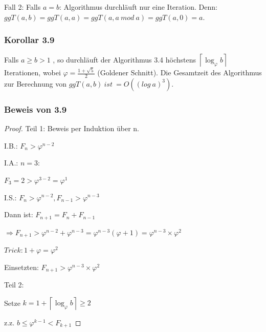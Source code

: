\documentclass[12pt]{article}
\begin{document}
\begin{algorithm}
\vspace{0.2cm}
\noindent Fall 2: Falls $a=b$: Algorithmus durchläuft nur eine Iteration. Denn: $ggT(a,b)= ggT(a,a)= ggT(a, a \ mod \ a)= ggT(a, 0) = a$.

\vspace{1cm}
\subsubsection*{Korollar 3.9}
Falls $a \geq b > 1 $ , so durchläuft der Algorithmus 3.4 höchstens $\left\lceil \log_{\varphi} b \right\rceil$ Iterationen, wobei $\varphi = \frac{1 + \sqrt{5}}{2}$  (Goldener Schnitt).
Die Gesamtzeit des Algorithmus zur Berechnung von $ggT(a,b) \ ist \ = O ((log \ a)^3)$.

\vspace{1cm}
\subsubsection*{Beweis von 3.9 }

\begin{proof}

Teil 1: Beweis per Induktion über n. 


\indent I.B.: $ F_n > \varphi ^{n-2}$


\vspace{0.3cm}
\indent I.A.: $ n=3: $

$F_3= 2 > \varphi ^ {3-2} = \varphi ^1$


\vspace{=0.3cm}


I.S.: $ F_n > \varphi ^{n-2}, F_{n-1} > \varphi ^ {n-3}$


\vspace{0.15cm}
Dann ist: $ F_{n+1}= F_n + F_ {n-1}$ 

$\Rightarrow F_{n+1} > \varphi ^{n-2} + \varphi ^ {n-3} = \varphi ^ {n-3} ( \varphi +1) = \varphi ^ {n-3} \times \varphi ^2$


\vspace{0.15cm}
 $Trick: 1+ \varphi = \varphi^2 $


 \vspace{0.15cm}
 Einsetzten: $F_{n+1} > \varphi ^{n-3} \times \varphi ^2$


 \vspace{0.7cm}

\noindent Teil 2: 


 Setze $k= 1 + \left\lceil \log_{\varphi} b \right\rceil \geq 2$ 

 z.z. $b \leq  \varphi ^{k-1} < F_{k+1}$ 
 

\end{proof}
\end{algorithm}
\end{document}
